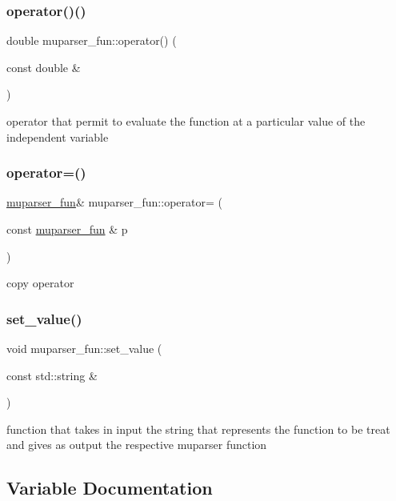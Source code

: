 \subsubsection{\texorpdfstring{operator()()}{operator()()}}
{\footnotesize\ttfamily double muparser\+\_\+fun\+::operator() (\begin{DoxyParamCaption}\item[{const double \&}]{ }\end{DoxyParamCaption})}

operator that permit to evaluate the function at a particular value of the independent variable \mbox{\label{group__MuParser_ga6e4082f4ba40e947b734195a337823d9}} 
\subsubsection{\texorpdfstring{operator=()}{operator=()}}
{\footnotesize\ttfamily \hyperlink{classmuparser__fun}{muparser\+\_\+fun}\& muparser\+\_\+fun\+::operator= (\begin{DoxyParamCaption}\item[{const \hyperlink{classmuparser__fun}{muparser\+\_\+fun} \&}]{p }\end{DoxyParamCaption})}

copy operator \mbox{\label{group__MuParser_ga1e7855a7285191f81deddf262cac949a}} 
\subsubsection{\texorpdfstring{set\+\_\+value()}{set\_value()}}
{\footnotesize\ttfamily void muparser\+\_\+fun\+::set\+\_\+value (\begin{DoxyParamCaption}\item[{const std\+::string \&}]{ }\end{DoxyParamCaption})}

function that takes in input the string that represents the function to be treat and gives as output the respective muparser function 

\subsection{Variable Documentation}
\mbox{\label{group__MuParser_gad94fb029c66d186b6fe278b51df8dfc4}} 
